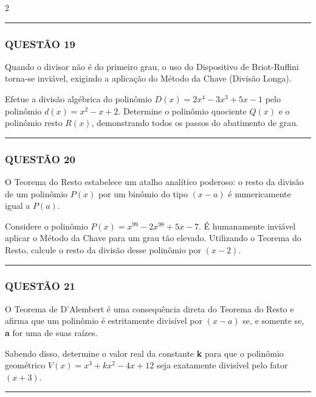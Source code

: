 \documentclass[11pt, a4paper]{article}
\begin{document}
\begin{multicols*}{2}
\vspace{0cm} \noindent\textcolor{CorLinha}{\rule{\linewidth}{0.5pt}} \vspace{-0.2cm}
\subsubsection*{QUESTÃO 19}

Quando o divisor não é do primeiro grau, o uso do Dispositivo de Briot-Ruffini torna-se inviável, exigindo a aplicação do Método da Chave (Divisão Longa). 

Efetue a divisão algébrica do polinômio $ D(x) = 2x^4 - 3x^3 + 5x - 1 $ pelo polinômio $ d(x) = x^2 - x + 2 $. Determine o polinômio quociente $ Q(x) $ e o polinômio resto $ R(x) $, demonstrando todos os passos do abatimento de grau.

\vspace{0cm} \noindent\textcolor{CorLinha}{\rule{\linewidth}{0.5pt}} \vspace{-0.2cm}
\subsubsection*{QUESTÃO 20}

O Teorema do Resto estabelece um atalho analítico poderoso: o resto da divisão de um polinômio $ P(x) $ por um binômio do tipo $ (x - a) $ é numericamente igual a $ P(a) $.

Considere o polinômio $ P(x) = x^{99} - 2x^{98} + 5x - 7 $. É humanamente inviável aplicar o Método da Chave para um grau tão elevado. Utilizando o Teorema do Resto, calcule o resto da divisão desse polinômio por $ (x - 2) $.

\vspace{0cm} \noindent\textcolor{CorLinha}{\rule{\linewidth}{0.5pt}} \vspace{-0.2cm}
\subsubsection*{QUESTÃO 21}

O Teorema de D'Alembert é uma consequência direta do Teorema do Resto e afirma que um polinômio é estritamente divisível por $ (x - a) $ se, e somente se, \textbf{a} for uma de suas raízes. 

Sabendo disso, determine o valor real da constante \textbf{k} para que o polinômio geométrico $ V(x) = x^3 + kx^2 - 4x + 12 $ seja exatamente divisível pelo fator $ (x + 3) $.

\vspace{0cm} \noindent\textcolor{CorLinha}{\rule{\linewidth}{0.5pt}} \vspace{-0.2cm}

\end{multicols*}
\end{document}
